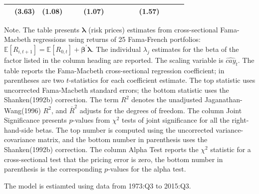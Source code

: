 \documentclass[12pt]{article}
\newcommand{\E}{\mathbb{E}}
\begin{document}
\begin{landscape}
\begin{threeparttable}[htbp]
\begin{tabular}{lccccccccccccc}
   & (3.63) & (1.08) &  &  & (1.07) &  &  &  &  & (1.57) &  &  &  \\ 
\bottomrule
\end{tabular}
\begin{tablenotes}\footnotesize
 \item \quad Note. The table presents $\bm{\lambda}$ (risk prices) estimates from cross-sectional Fama-Macbeth regressions using returns of 25 Fama-French portfolios: $\E[R_{i,t+1}] = \E[R_{0,t}] + \bm{\beta}^{\prime} \bm{\lambda} $. The individual $\lambda_j$ estimates for the beta of the factor listed in the column heading are reported. The scaling variable is $\widehat{cay}_t$. The table reports the Fama-Macbeth cross-sectional regression coefficient; in parentheses are two  $t$-statistics for each coefficient estimate. The top statistic uses uncorrected Fama-Macbeth standard errors; the bottom statistic uses the Shanken(1992b) correction. The term $R^2$ denotes the unadjusted Jaganathan-Wang(1996) $R^2$, and $\bar{R}^2$ adjusts for the degrees of freedom. The column Joint Significance presents $p$-values from $\chi^2$ tests of joint significance for all the right-hand-side betas. The top number is computed using the uncorrected variance-covariance matrix, and the bottom number in parenthesis uses the Shanken(1992b) correction. The column Alpha Test reports the $\chi^2$ statistic for a cross-sectional test that the pricing error is zero, the bottom number in parenthesis is the corresponding $p$-values for the alpha test. 
 \item \quad The model is estiamted using data from 1973:Q3 to 2015:Q3. 
\end{tablenotes}
\end{threeparttable}
\end{landscape}




\end{document}
